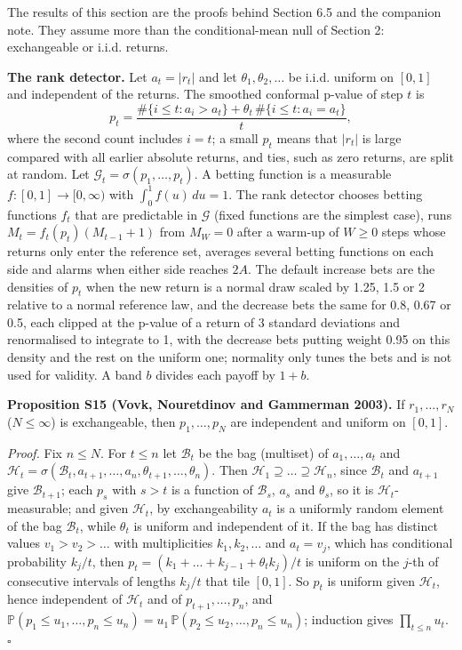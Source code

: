 \documentclass[
]{article}
\begin{document}
The results of this section are the proofs behind Section 6.5 and the
companion note. They assume more than the conditional-mean null of
Section 2: exchangeable or i.i.d. returns.

\textbf{The rank detector.} Let \(a_t = \lvert r_t\rvert\) and let
\(\theta_1, \theta_2, \dots\) be i.i.d. uniform on \([0, 1]\) and
independent of the returns. The smoothed conformal p-value of step \(t\)
is \[
p_t = \frac{\#\lbrace i \le t : a_i > a_t\rbrace + \theta_t\,\#\lbrace i \le t : a_i = a_t\rbrace}{t},
\] where the second count includes \(i = t\); a small \(p_t\) means that
\(\lvert r_t\rvert\) is large compared with all earlier absolute
returns, and ties, such as zero returns, are split at random. Let
\(\mathcal{G}_t = \sigma(p_1, \dots, p_t)\). A betting function is a
measurable \(f: [0, 1] \to [0, \infty)\) with \(\int_0^1 f(u)\,du = 1\).
The rank detector chooses betting functions \(f_t\) that are predictable
in \(\mathcal{G}\) (fixed functions are the simplest case), runs
\(M_t = f_t(p_t)(M_{t-1} + 1)\) from \(M_W = 0\) after a warm-up of
\(W \ge 0\) steps whose returns only enter the reference set, averages
several betting functions on each side and alarms when either side
reaches \(2A\). The default increase bets are the densities of \(p_t\)
when the new return is a normal draw scaled by 1.25, 1.5 or 2 relative
to a normal reference law, and the decrease bets the same for 0.8, 0.67
or 0.5, each clipped at the p-value of a return of 3 standard deviations
and renormalised to integrate to 1, with the decrease bets putting
weight 0.95 on this density and the rest on the uniform one; normality
only tunes the bets and is not used for validity. A band \(b\) divides
each payoff by \(1 + b\).

\textbf{Proposition S15 (Vovk, Nouretdinov and Gammerman 2003).} If
\(r_1, \dots, r_N\) (\(N \le \infty\)) is exchangeable, then
\(p_1, \dots, p_N\) are independent and uniform on \([0, 1]\).

\emph{Proof.} Fix \(n \le N\). For \(t \le n\) let \(\mathcal{B}_t\) be
the bag (multiset) of \(a_1, \dots, a_t\) and
\(\mathcal{H}_t = \sigma(\mathcal{B}_t, a_{t+1}, \dots, a_n, \theta_{t+1}, \dots, \theta_n)\).
Then \(\mathcal{H}_1 \supseteq \dots \supseteq \mathcal{H}_n\), since
\(\mathcal{B}_t\) and \(a_{t+1}\) give \(\mathcal{B}_{t+1}\); each
\(p_s\) with \(s > t\) is a function of \(\mathcal{B}_s\), \(a_s\) and
\(\theta_s\), so it is \(\mathcal{H}_t\)-measurable; and given
\(\mathcal{H}_t\), by exchangeability \(a_t\) is a uniformly random
element of the bag \(\mathcal{B}_t\), while \(\theta_t\) is uniform and
independent of it. If the bag has distinct values \(v_1 > v_2 > \dots\)
with multiplicities \(k_1, k_2, \dots\) and \(a_t = v_j\), which has
conditional probability \(k_j/t\), then
\(p_t = (k_1 + \dots + k_{j-1} + \theta_t k_j)/t\) is uniform on the
\(j\)-th of consecutive intervals of lengths \(k_j/t\) that tile
\([0, 1]\). So \(p_t\) is uniform given \(\mathcal{H}_t\), hence
independent of \(\mathcal{H}_t\) and of \(p_{t+1}, \dots, p_n\), and
\(\mathbb{P}(p_1 \le u_1, \dots, p_n \le u_n) = u_1\,\mathbb{P}(p_2 \le u_2, \dots, p_n \le u_n)\);
induction gives \(\prod_{t \le n} u_t\). \(\square\)
\end{document}
